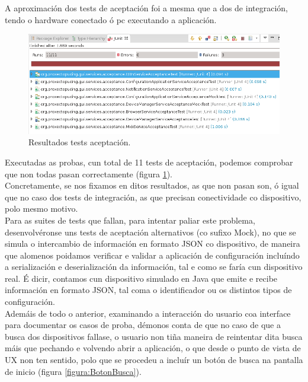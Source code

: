  A aproximación dos tests de aceptación foi a mesma que a dos de integración,
 tendo o hardware conectado ó pc executando a aplicación. \\
 
 \begin{figure}[htbp]
  \centering
  \includegraphics[scale=0.6,keepaspectratio=true]{./imagenes/resultados-tests-aceptacion.png}
  \caption{Resultados tests aceptación.}
  \label{figura:ResultadosTestAceptacion}
 \end{figure}
  
 Executadas as probas, cun total de 11 tests de aceptación, podemos comprobar
 que non todas pasan correctamente
 (figura \ref{figura:ResultadosTestAceptacion}). \\
 
 Concretamente, se nos fixamos en ditos resultados, as que non pasan son, ó
 igual que no caso dos tests de integración, as que precisan conectividade co
 dispositivo, polo mesmo motivo. \\
 
 Para as suites de tests que fallan, para intentar paliar este problema,
 desenvolvéronse uns tests de aceptación alternativos (co sufixo Mock), no que
 se simula o intercambio de información en formato JSON co dispositivo, de
 maneira que alomenos poidamos verificar e validar a aplicación de configuración
 incluíndo a serialización e deserialización da información, tal e como se faría
 cun dispositivo real. É dicir, contamos cun dispositivo simulado en Java que
 emite e recibe información en formato JSON, tal coma o identificador ou os
 distintos tipos de configuración. \\
 
 Ademáis de todo o anterior, examinando a interacción do usuario coa interface
 para documentar os casos de proba, démonos conta de que no caso de que a busca
 dos dispositivos fallase, o usuario non tiña maneira de reintentar dita busca
 máis que pechando e volvendo abrir a aplicación, o que desde o punto de vista
 de UX non ten sentido, polo que se procedeu a incluír un botón de busca na
 pantalla de inicio (figura \ref{figura:BotonBusca}).
 
